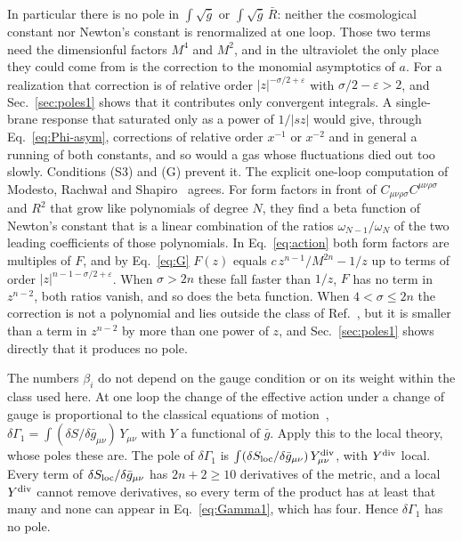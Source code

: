 \documentclass[a4paper,11pt]{article}
\begin{document}
In particular there is no pole in $\int\sqrt{\bar g}$ or $\int\sqrt{\bar g}\,\bar R$: neither the cosmological constant nor Newton's constant is renormalized at one loop. Those two terms need the dimensionful factors $M^4$ and $M^2$, and in the ultraviolet the only place they could come from is the correction to the monomial asymptotics of $a$. For a realization that correction is of relative order $|z|^{-\sigma/2+\varepsilon}$ with $\sigma/2-\varepsilon>2$, and Sec.~\ref{sec:poles1} shows that it contributes only convergent integrals. A single-brane response that saturated only as a power of $1/|sz|$ would give, through Eq.~\eqref{eq:Phi-asym}, corrections of relative order $x^{-1}$ or $x^{-2}$ and in general a running of both constants, and so would a gas whose fluctuations died out too slowly. Conditions (S3) and (G) prevent it. The explicit one-loop computation of Modesto, Rachwa{\l} and Shapiro~\cite{ModestoRachwalShapiro2018} agrees. For form factors in front of $C_{\mu\nu\rho\sigma}C^{\mu\nu\rho\sigma}$ and $R^2$ that grow like polynomials of degree $N$, they find a beta function of Newton's constant that is a linear combination of the ratios $\omega_{N-1}/\omega_N$ of the two leading coefficients of those polynomials. In Eq.~\eqref{eq:action} both form factors are multiples of $F$, and by Eq.~\eqref{eq:G} $F(z)$ equals $c\,z^{n-1}/M^{2n}-1/z$ up to terms of order $|z|^{n-1-\sigma/2+\varepsilon}$. When $\sigma>2n$ these fall faster than $1/z$, $F$ has no term in $z^{n-2}$, both ratios vanish, and so does the beta function. When $4<\sigma\le2n$ the correction is not a polynomial and lies outside the class of Ref.~\cite{ModestoRachwalShapiro2018}, but it is smaller than a term in $z^{n-2}$ by more than one power of $z$, and Sec.~\ref{sec:poles1} shows directly that it produces no pole.

The numbers $\beta_i$ do not depend on the gauge condition or on its weight within the class used here. At one loop the change of the effective action under a change of gauge is proportional to the classical equations of motion~\cite{KalloshTarasovTyutin1978}, $\delta\Gamma_1=\int(\delta S/\delta\bar g_{\mu\nu})\,Y_{\mu\nu}$ with $Y$ a functional of $\bar g$. Apply this to the local theory, whose poles these are. The pole of $\delta\Gamma_1$ is $\int(\delta S_{\rm loc}/\delta\bar g_{\mu\nu})\,Y^{\rm div}_{\mu\nu}$, with $Y^{\rm div}$ local. Every term of $\delta S_{\rm loc}/\delta\bar g_{\mu\nu}$ has $2n+2\ge10$ derivatives of the metric, and a local $Y^{\rm div}$ cannot remove derivatives, so every term of the product has at least that many and none can appear in Eq.~\eqref{eq:Gamma1}, which has four. Hence $\delta\Gamma_1$ has no pole.
\end{document}
